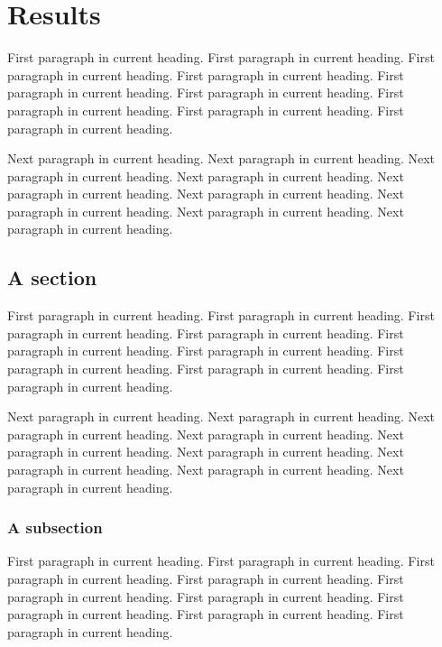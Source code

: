 \chapter{Results}

\noindent   %
First paragraph in current heading. First paragraph in current heading.
First paragraph in current heading. First paragraph in current heading.
First paragraph in current heading. First paragraph in current heading.
First paragraph in current heading. First paragraph in current heading.
First paragraph in current heading.

Next paragraph in current heading. Next paragraph in current heading.
Next paragraph in current heading. Next paragraph in current heading.
Next paragraph in current heading. Next paragraph in current heading.
Next paragraph in current heading. Next paragraph in current heading.
Next paragraph in current heading.

\section{A section}

\noindent   %
First paragraph in current heading. First paragraph in current heading.
First paragraph in current heading. First paragraph in current heading.
First paragraph in current heading. First paragraph in current heading.
First paragraph in current heading. First paragraph in current heading.
First paragraph in current heading.

Next paragraph in current heading. Next paragraph in current heading.
Next paragraph in current heading. Next paragraph in current heading.
Next paragraph in current heading. Next paragraph in current heading.
Next paragraph in current heading. Next paragraph in current heading.
Next paragraph in current heading.

    \subsection{A subsection}

\noindent   %
First paragraph in current heading. First paragraph in current heading.
First paragraph in current heading. First paragraph in current heading.
First paragraph in current heading. First paragraph in current heading.
First paragraph in current heading. First paragraph in current heading.
First paragraph in current heading.

